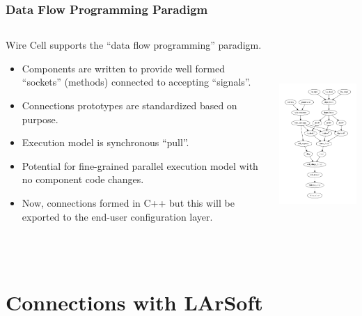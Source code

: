 \documentclass[xcolor=dvipsnames]{beamer}
\begin{document}
\begin{frame}
  \frametitle{Data Flow Programming Paradigm}

  \begin{columns}
    \footnotesize
    \begin{column}{0.5\paperwidth}
      Wire Cell supports the ``data flow programming'' paradigm.
      \scriptsize
      \begin{itemize}
      \item Components are written to provide well formed ``sockets''
        (methods) connected to accepting ``signals''.
      \item Connections prototypes are standardized based on purpose.
      \item Execution model is synchronous ``pull''.
      \item Potential  for
        fine-grained parallel execution model with no component code changes. 
      \item Now, connections formed in C++ but this will be exported
        to the end-user configuration layer.        
      \end{itemize}
    \end{column}
    \begin{column}{0.4\paperwidth}
      \begin{center}
        \vspace{-1cm}

        \includegraphics[height=8cm]{dataflow.pdf}
      \end{center}
      
    \end{column}
  \end{columns}
\end{frame}

\section{Connections with LArSoft}
\end{document}
